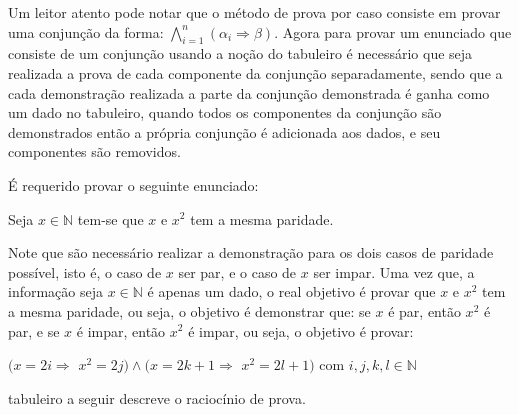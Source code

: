 Um leitor atento pode notar que o método de prova por caso consiste em provar uma conjunção da forma: $\displaystyle \bigwedge_{i=1}^n(\alpha_i \Rightarrow \beta)$. Agora para provar um enunciado que consiste de um conjunção usando a noção do tabuleiro é necessário que seja realizada a prova de cada componente da conjunção separadamente, sendo que a cada demonstração realizada a parte da conjunção demonstrada é ganha como um dado no tabuleiro, quando todos os componentes da conjunção são demonstrados então a própria conjunção é adicionada aos dados, e seu componentes são removidos.

\begin{exem}\label{exe:ProvaCaso1}
	É requerido provar o seguinte enunciado:
	\begin{center}
		Seja $x \in \mathbb{N}$ tem-se que $x$ e $x^2$ tem a mesma paridade.
	\end{center}
	Note que são necessário realizar a demonstração para os dois casos de paridade possível, isto é,  o caso de $x$ ser par, e o caso de $x$ ser impar. Uma vez que, a informação seja $x \in \mathbb{N}$ é apenas um dado, o real objetivo é provar que $x$ e $x^2$ tem a mesma paridade, ou seja, o objetivo é demonstrar que: se $x$ é par, então $x^2$ é par, e se $x$ é impar, então $x^2$ é impar, ou seja, o objetivo é provar:
	\begin{center}
		 $(x = 2i \Rightarrow$ $x^2 = 2j) \land (x = 2k + 1 \Rightarrow$ $x^2 = 2l + 1)$ com $i, j, k, l \in \mathbb{N}$
	\end{center}
	
	tabuleiro a seguir descreve o raciocínio de prova. 
	

\end{exem}
